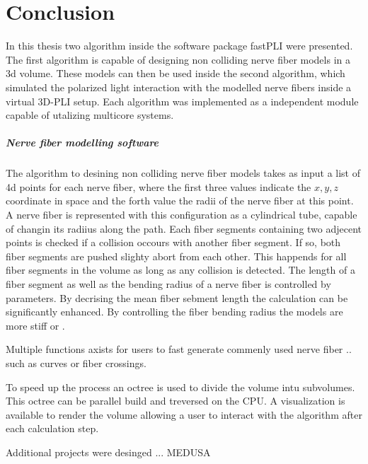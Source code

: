 \chapter{Conclusion}
\label{sec:conclusion}
% 
In this thesis two algorithm inside the software package \ac{fastPLI} were presented.
The first algorithm is capable of designing non colliding nerve fiber models in a 3d volume.
These models can then be used inside the second algorithm, which simulated the polarized light interaction with the modelled nerve fibers inside a virtual \ac{3D-PLI} setup.
Each algorithm was implemented as a independent \python{} module capable of utalizing multicore systems.
% 
\paragraph{Nerve fiber modelling software}
The algorithm to desining non colliding nerve fiber models takes as input a list of 4d points for each nerve fiber, where the first three values indicate the $x,y,z$ coordinate in space and the forth value the radii of the nerve fiber at this point.
A nerve fiber is represented with this configuration as a cylindrical tube, capable of changin its radiius along the path.
Each fiber segments containing two adjecent points is checked if a collision occours with another fiber segment.
If so, both fiber segments are pushed slighty abort from each other.
This happends for all fiber segments in the volume as long as any collision is detected.
The length of a fiber segment as well as the bending radius of a nerve fiber is controlled by parameters.
By decrising the mean fiber sebment length the calculation can be significantly enhanced. 
By controlling the fiber bending radius the models are more stiff or \dummy{}.
\par
Multiple functions axists for users to fast generate commenly used nerve fiber  .. such as curves or fiber crossings.
% 
\par
% 
To speed up the process an octree is used to divide the volume intu subvolumes.
This octree can be parallel build and treversed on the \ac{CPU}.
A visualization is available to render the volume allowing a user to interact with the algorithm after each calculation step.
\par
% 
Additional projects were desinged ... MEDUSA
% 
% 
% 
